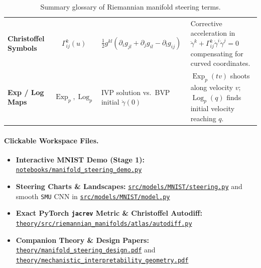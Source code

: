 \documentclass[11pt,a4paper]{article}
\DeclareMathOperator{\Exp}{Exp}
\DeclareMathOperator{\Log}{Log}
\theoremstyle{definition}
\begin{document}
\begin{table}[ht!]
\begin{tabularx}{\textwidth}{@{} >{\bfseries}p{} c >{\raggedright\arraybackslash}p{} Y @{}}
Christoffel Symbols & $\Gamma^k_{ij}(u)$ & $\frac{1}{2}g^{kl}(\partial_i g_{jl} + \partial_j g_{il} - \partial_l g_{ij})$ & Corrective acceleration in $\ddot{\gamma}^k + \Gamma^k_{ij}\dot{\gamma}^i\dot{\gamma}^j = 0$ compensating for curved coordinates. \\
Exp / Log Maps & $\Exp_p, \Log_p$ & IVP solution vs.\ BVP initial $\dot{\gamma}(0)$ & $\Exp_p(tv)$ shoots along velocity $v$; $\Log_p(q)$ finds initial velocity reaching $q$. \\
\bottomrule
\end{tabularx}
\caption{Summary glossary of Riemannian manifold steering terms.}
\label{tab:glossary}
\end{table}

\paragraph{Clickable Workspace Files.}
\begin{itemize}[leftmargin=*,nosep]
    \item \textbf{Interactive MNIST Demo (Stage 1):} \href{run:../notebooks/manifold_steering_demo.py}{\nolinkurl{notebooks/manifold_steering_demo.py}}
    \item \textbf{Steering Charts \& Landscapes:} \href{run:../src/models/MNIST/steering.py}{\nolinkurl{src/models/MNIST/steering.py}} and smooth \texttt{SMU} CNN in \href{run:../src/models/MNIST/model.py}{\nolinkurl{src/models/MNIST/model.py}}
    \item \textbf{Exact PyTorch \texttt{jacrev} Metric \& Christoffel Autodiff:} \href{run:src/riemannian_manifolds/atlas/autodiff.py}{\nolinkurl{theory/src/riemannian_manifolds/atlas/autodiff.py}}
    \item \textbf{Companion Theory \& Design Papers:} \href{run:manifold_steering_design.pdf}{\nolinkurl{theory/manifold_steering_design.pdf}} and \href{run:mechanistic_interpretability_geometry.pdf}{\nolinkurl{theory/mechanistic_interpretability_geometry.pdf}}
\end{itemize}
\end{document}
